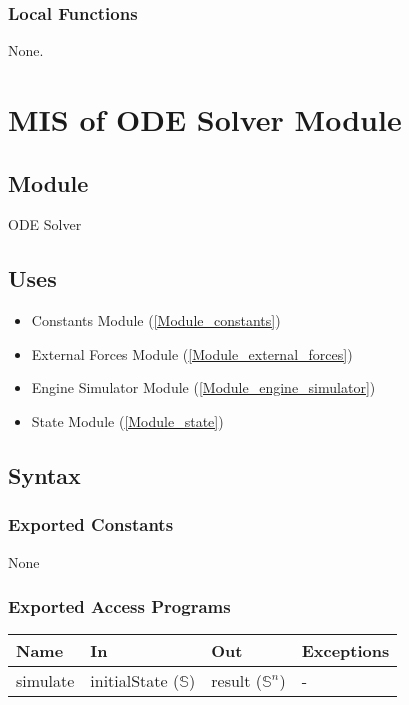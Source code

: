 \documentclass[12pt, titlepage]{article}
\begin{document}
\subsubsection{Local Functions}

None.

\newpage

\section{MIS of ODE Solver Module} \label{Module_ODE_solver}

\subsection{Module}

ODE Solver

\subsection{Uses}

\begin{itemize}
  \item Constants Module (\ref{Module_constants})
  \item External Forces Module (\ref{Module_external_forces})
  \item Engine Simulator Module (\ref{Module_engine_simulator})
  \item State Module (\ref{Module_state})
\end{itemize}

\subsection{Syntax}

\subsubsection{Exported Constants}
None

\subsubsection{Exported Access Programs}

\begin{center}
\begin{tabular}{p{2cm} p{4cm} p{4cm} p{2cm}}
\hline
\textbf{Name} & \textbf{In} & \textbf{Out} & \textbf{Exceptions} \\
\hline
simulate & initialState ($\mathbb{S}$) & result ($\mathbb{S}^n$) & - \\
\hline
\end{tabular}
\end{center}
\end{document}
